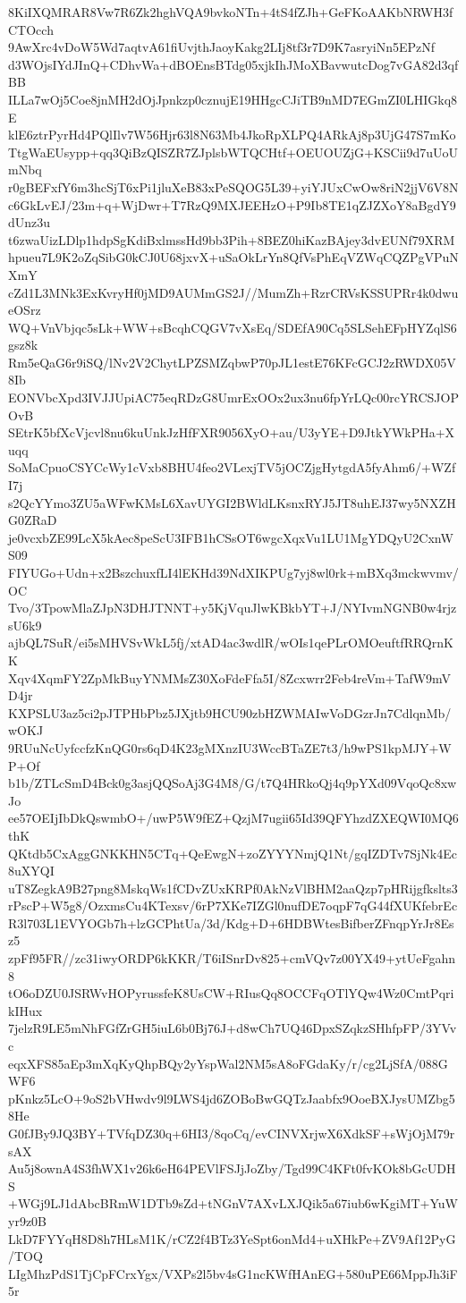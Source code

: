 8KiIXQMRAR8Vw7R6Zk2hghVQA9bvkoNTn+4tS4fZJh+GeFKoAAKbNRWH3fCTOcch
9AwXrc4vDoW5Wd7aqtvA61fiUvjthJaoyKakg2LIj8tf3r7D9K7asryiNn5EPzNf
d3WOjsIYdJInQ+CDhvWa+dBOEnsBTdg05xjkIhJMoXBavwutcDog7vGA82d3qfBB
ILLa7wOj5Coe8jnMH2dOjJpnkzp0cznujE19HHgcCJiTB9nMD7EGmZI0LHIGkq8E
klE6ztrPyrHd4PQlIlv7W56Hjr63l8N63Mb4JkoRpXLPQ4ARkAj8p3UjG47S7mKo
TtgWaEUsypp+qq3QiBzQISZR7ZJplsbWTQCHtf+OEUOUZjG+KSCii9d7uUoUmNbq
r0gBEFxfY6m3hcSjT6xPi1jluXeB83xPeSQOG5L39+yiYJUxCwOw8riN2jjV6V8N
c6GkLvEJ/23m+q+WjDwr+T7RzQ9MXJEEHzO+P9Ib8TE1qZJZXoY8aBgdY9dUnz3u
t6zwaUizLDlp1hdpSgKdiBxlmssHd9bb3Pih+8BEZ0hiKazBAjey3dvEUNf79XRM
hpueu7L9K2oZqSibG0kCJ0U68jxvX+uSaOkLrYn8QfVsPhEqVZWqCQZPgVPuNXmY
cZd1L3MNk3ExKvryHf0jMD9AUMmGS2J//MumZh+RzrCRVsKSSUPRr4k0dwueOSrz
WQ+VnVbjqc5sLk+WW+sBcqhCQGV7vXsEq/SDEfA90Cq5SLSehEFpHYZqlS6gsz8k
Rm5eQaG6r9iSQ/lNv2V2ChytLPZSMZqbwP70pJL1estE76KFcGCJ2zRWDX05V8Ib
EONVbcXpd3IVJJUpiAC75eqRDzG8UmrExOOx2ux3nu6fpYrLQc00rcYRCSJOPOvB
SEtrK5bfXcVjcvl8nu6kuUnkJzHfFXR9056XyO+au/U3yYE+D9JtkYWkPHa+Xuqq
SoMaCpuoCSYCcWy1cVxb8BHU4feo2VLexjTV5jOCZjgHytgdA5fyAhm6/+WZfI7j
s2QcYYmo3ZU5aWFwKMsL6XavUYGI2BWldLKsnxRYJ5JT8uhEJ37wy5NXZHG0ZRaD
je0vcxbZE99LcX5kAec8peScU3IFB1hCSsOT6wgcXqxVu1LU1MgYDQyU2CxnWS09
FIYUGo+Udn+x2BszchuxfLI4lEKHd39NdXIKPUg7yj8wl0rk+mBXq3mckwvmv/OC
Tvo/3TpowMlaZJpN3DHJTNNT+y5KjVquJlwKBkbYT+J/NYIvmNGNB0w4rjzsU6k9
ajbQL7SuR/ei5sMHVSvWkL5fj/xtAD4ac3wdlR/wOIs1qePLrOMOeuftfRRQrnKK
Xqv4XqmFY2ZpMkBuyYNMMsZ30XoFdeFfa5I/8Zcxwrr2Feb4reVm+TafW9mVD4jr
KXPSLU3az5ci2pJTPHbPbz5JXjtb9HCU90zbHZWMAIwVoDGzrJn7CdlqnMb/wOKJ
9RUuNcUyfccfzKnQG0rs6qD4K23gMXnzIU3WccBTaZE7t3/h9wPS1kpMJY+WP+Of
b1b/ZTLcSmD4Bck0g3asjQQSoAj3G4M8/G/t7Q4HRkoQj4q9pYXd09VqoQc8xwJo
ee57OEIjIbDkQswmbO+/uwP5W9fEZ+QzjM7ugii65Id39QFYhzdZXEQWI0MQ6thK
QKtdb5CxAggGNKKHN5CTq+QeEwgN+zoZYYYNmjQ1Nt/gqIZDTv7SjNk4Ec8uXYQI
uT8ZegkA9B27png8MskqWs1fCDvZUxKRPf0AkNzVlBHM2aaQzp7pHRijgfkslts3
rPscP+W5g8/OzxmsCu4KTexsv/6rP7XKe7IZGl0nufDE7oqpF7qG44fXUKfebrEc
R3l703L1EVYOGb7h+lzGCPhtUa/3d/Kdg+D+6HDBWtesBifberZFnqpYrJr8Esz5
zpFf95FR//zc31iwyORDP6kKKR/T6iISnrDv825+cmVQv7z00YX49+ytUeFgahn8
tO6oDZU0JSRWvHOPyrussfeK8UsCW+RIusQq8OCCFqOTlYQw4Wz0CmtPqrikIHux
7jelzR9LE5mNhFGfZrGH5iuL6b0Bj76J+d8wCh7UQ46DpxSZqkzSHhfpFP/3YVvc
eqxXFS85aEp3mXqKyQhpBQy2yYspWal2NM5sA8oFGdaKy/r/cg2LjSfA/088GWF6
pKnkz5LcO+9oS2bVHwdv9l9LWS4jd6ZOBoBwGQTzJaabfx9OoeBXJysUMZbg58He
G0fJBy9JQ3BY+TVfqDZ30q+6HI3/8qoCq/evCINVXrjwX6XdkSF+sWjOjM79rsAX
Au5j8ownA4S3fhWX1v26k6eH64PEVlFSJjJoZby/Tgd99C4KFt0fvKOk8bGcUDHS
+WGj9LJ1dAbcBRmW1DTb9sZd+tNGnV7AXvLXJQik5a67iub6wKgiMT+YuWyr9z0B
LkD7FYYqH8D8h7HLsM1K/rCZ2f4BTz3YeSpt6onMd4+uXHkPe+ZV9Af12PyG/TOQ
LIgMhzPdS1TjCpFCrxYgx/VXPs2l5bv4sG1ncKWfHAnEG+580uPE66MppJh3iF5r
